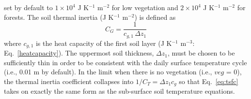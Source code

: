 set by default to $1\times 10^4$ J K$^{-1}$ m$^{-2}$ for low
vegetation 
and $2\times 10^4$ J K$^{-1}$ m$^{-2}$ for forests.
%
The soil thermal inertia (J K$^{-1}$ m$^{-2}$) is
defined as
%
\begin{equation}
C_G = \frac{1}{c_{g,1}\,\Delta z_1}
\end{equation}
%
where $c_{g,1}$ is the heat capacity of the first soil layer
(J K$^{-1}$ m$^{-3}$: Eq.~\ref{heatcapacity}).
The uppermost soil thickness, $\Delta z_1$, must be chosen to be sufficiently
thin in order to be consistent with the daily surface temperature
cycle (i.e., 0.01 m by default). 
%
%
%
%
%
%
In the limit when there is no vegetation (i.e., $veg$ = 0), the
thermal inertia coefficient collapses into $1/C_T = \Delta z_1 c_g$
so that Eq.~\ref{eq:tsfc} takes on exactly the same form as the sub-surface soil
temperature equations. 


